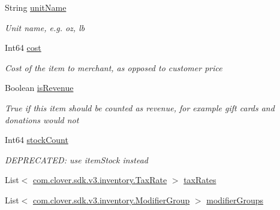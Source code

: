 \begin{DoxyCompactItemize}
String \hyperlink{classcom_1_1clover_1_1sdk_1_1v3_1_1inventory_1_1_item_a3831c28627732a1c99f5c3ecfe8ada43}{unit\+Name}
\begin{DoxyCompactList}\small\item\em Unit name, e.\+g. oz, lb \end{DoxyCompactList}\item 
Int64 \hyperlink{classcom_1_1clover_1_1sdk_1_1v3_1_1inventory_1_1_item_ae6641b1de1f59b1ae077c627f29324d9}{cost}
\begin{DoxyCompactList}\small\item\em Cost of the item to merchant, as opposed to customer price \end{DoxyCompactList}\item 
Boolean \hyperlink{classcom_1_1clover_1_1sdk_1_1v3_1_1inventory_1_1_item_a36d5c01f6ce6ee7385d1f34c3933369a}{is\+Revenue}
\begin{DoxyCompactList}\small\item\em True if this item should be counted as revenue, for example gift cards and donations would not \end{DoxyCompactList}\item 
Int64 \hyperlink{classcom_1_1clover_1_1sdk_1_1v3_1_1inventory_1_1_item_a4949190b359070e62d1c370efcc47fcf}{stock\+Count}
\begin{DoxyCompactList}\small\item\em D\+E\+P\+R\+E\+C\+A\+T\+ED\+: use item\+Stock instead \end{DoxyCompactList}\item 
List$<$ \hyperlink{classcom_1_1clover_1_1sdk_1_1v3_1_1inventory_1_1_tax_rate}{com.\+clover.\+sdk.\+v3.\+inventory.\+Tax\+Rate} $>$ \hyperlink{classcom_1_1clover_1_1sdk_1_1v3_1_1inventory_1_1_item_a22ded520de11eba7869f8b7964235c1d}{tax\+Rates}
\item 
List$<$ \hyperlink{classcom_1_1clover_1_1sdk_1_1v3_1_1inventory_1_1_modifier_group}{com.\+clover.\+sdk.\+v3.\+inventory.\+Modifier\+Group} $>$ \hyperlink{classcom_1_1clover_1_1sdk_1_1v3_1_1inventory_1_1_item_a1661611e4da6946eea0092d541564758}{modifier\+Groups}

\end{DoxyCompactItemize}
